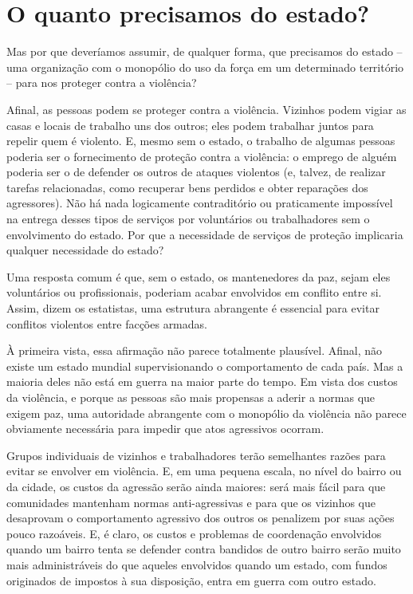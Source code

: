 \section{O quanto precisamos do estado?}

Mas por que deveríamos assumir, de qualquer forma, que precisamos do estado -- uma organização com o monopólio do uso da força em um determinado território -- para nos proteger contra a violência? 

Afinal, as pessoas podem se proteger contra a violência. Vizinhos podem vigiar as casas e locais de trabalho uns dos outros; eles podem trabalhar juntos para repelir quem é violento. E, mesmo sem o estado, o trabalho de algumas pessoas poderia ser o fornecimento de proteção contra a violência: o emprego de alguém poderia ser o de defender os outros de ataques violentos (e, talvez, de realizar tarefas relacionadas, como recuperar bens perdidos e obter reparações dos agressores). Não há nada logicamente contraditório ou praticamente impossível na entrega desses tipos de serviços por voluntários ou trabalhadores sem o envolvimento do estado. Por que a necessidade de serviços de proteção implicaria qualquer necessidade do estado?

Uma resposta comum é que, sem o estado, os mantenedores da paz, sejam eles voluntários ou profissionais, poderiam acabar envolvidos em conflito entre si. Assim, dizem os estatistas, uma estrutura abrangente é essencial para evitar conflitos violentos entre facções armadas.

À primeira vista, essa afirmação não parece totalmente plausível. Afinal, não existe um estado mundial supervisionando o comportamento de cada país. Mas a maioria deles não está em guerra na maior parte do tempo. Em vista dos custos da violência, e porque as pessoas são mais propensas a aderir a normas que exigem paz, uma autoridade abrangente com o monopólio da violência não parece obviamente necessária para impedir que atos agressivos ocorram.

Grupos individuais de vizinhos e trabalhadores terão semelhantes razões para evitar se envolver em violência. E, em uma pequena escala, no nível do bairro ou da cidade, os custos da agressão serão ainda maiores: será mais fácil para que comunidades mantenham normas anti-agressivas e para que os vizinhos que desaprovam o comportamento agressivo dos outros os penalizem por suas ações pouco razoáveis. E, é claro, os custos e problemas de coordenação envolvidos quando um bairro tenta se defender contra bandidos de outro bairro serão muito mais administráveis do que aqueles envolvidos quando um estado, com fundos originados de impostos à sua disposição, entra em guerra com outro estado.

